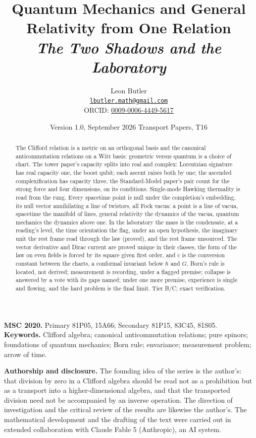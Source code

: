 \documentclass[11pt]{article}
\title{\bfseries Quantum Mechanics and General Relativity from One Relation\\[4pt]
  \large\itshape The Two Shadows and the Laboratory}
\author{Leon Butler\\ \normalsize\href{mailto:lbutler.math@gmail.com}{\texttt{lbutler.math@gmail.com}}\\ \normalsize ORCID: \href{https://orcid.org/0009-0006-4449-5617}{0009-0006-4449-5617}}
\date{Version 1.0, September 2026 \textperiodcentered{} Transport Papers, T16}
\theoremstyle{definition}
\begin{document}
\maketitle

\begin{abstract}
\normalsize
The Clifford relation is a metric on an orthogonal basis and the canonical anticommutation relations on a Witt basis: geometric versus quantum is a choice of chart. The tower paper's capacity splits into real and complex: Lorentzian signature has real capacity one, the boost qubit; each ascent raises both by one; the ascended complexification has capacity three, the Standard-Model paper's pair count for the strong force and four dimensions, on its conditions. Single-mode Hawking thermality is read from the rung. Every spacetime point is null under the completion's embedding, its null vector annihilating a line of twistors, all Fock vacua: a point is a line of vacua, spacetime the manifold of lines, general relativity the dynamics of the vacua, quantum mechanics the dynamics above one. In the laboratory the mass is the condensate, at a reading's level, the time orientation the flag, under an open hypothesis, the imaginary unit the rest frame read through the law (proved), and the rest frame unsourced. The vector derivative and Dirac current are proved unique in their classes, the form of the law on even fields is forced by its square given first order, and $c$ is the conversion constant between the charts, a conformal invariant below $\hbar$ and $G$. Born's rule is located, not derived; measurement is recording, under a flagged premise; collapse is answered by a vote with its gaps named; under one more premise, experience is single and flowing, and the hard problem is the final limit. Tier B/C; exact verification.
\end{abstract}

\medskip
\noindent\textbf{MSC 2020.} Primary 81P05, 15A66; Secondary 81P15, 83C45, 81S05.\\
\textbf{Keywords.} Clifford algebra; canonical anticommutation relations; pure spinors; foundations of quantum mechanics; Born rule; envariance; measurement problem; arrow of time.

\newpage
\textbf{Authorship and disclosure. }The founding idea of the series is the author's: that division by zero in a Clifford algebra should be read not as a prohibition but as a transport into a higher-dimensional algebra, and that the transported division need not be accompanied by an inverse operation. The direction of investigation and the critical review of the results are likewise the author's. The mathematical development and the drafting of the text were carried out in extended collaboration with Claude Fable 5 (Anthropic), an AI system.
\end{document}
